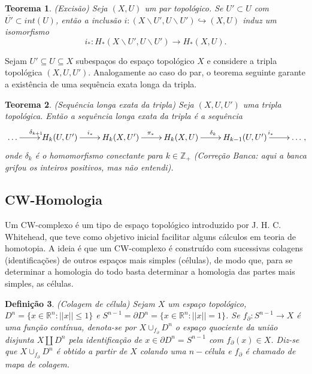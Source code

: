 \documentclass[12pt]{book}
\newtheorem{teorema}{Teorema}[section]
\newtheorem{definicao}[teorema]{Definição}
\newcommand{\complementar}[2]{#1 \backslash #2}
\newcommand{\homologiaabrev}[2]{H_{#1}(#2)}
\newcommand{\inteiros}{\mathbb{Z}}
\newcommand{\inteirospos}{\inteiros_{+}}
\newcommand{\alerta}[1]{{\color{red}#1}}
\newcommand{\correcaobanca}[1]{\alerta{(Correção Banca: #1)}}
\begin{document}
	\begin{teorema}
		(Excisão) Seja $(X, U)$ um par topológico. Se $U' \subset U$ com $\overline{U'} \subset int(U)$, então a inclusão $i : (\complementar{X}{U'}, \complementar{U}{U'}) \hookrightarrow (X, U)$ induz um isomorfismo 
		$$
		i_{*}: \homologiaabrev{*}{\complementar{X}{U'}, \complementar{U}{U'}} \to \homologiaabrev{*}{X, U}.
		$$
	\end{teorema}
	
	
	Sejam $U'\subseteq U \subseteq X$ subespaços do espaço topológico $X$ e considere a tripla topológica $(X, U, U')$. Analogamente ao caso do par, o teorema seguinte garante a existência de uma sequência exata longa da tripla.
	
	\begin{teorema}
		(Sequência longa exata da tripla) Seja $(X, U, U')$ uma tripla topológica. Então a sequência longa exata da tripla é a sequência
		$$
		\xymatrix{\dots \ar[r]^{\delta_{k+1}} & \homologiaabrev{k}{U, U'}\ar[r]^{i_{*}} & \homologiaabrev{k}{X, U'}\ar[r]^{\pi_{*}}& \homologiaabrev{k}{X, U}\ar[r]^{\delta_{k}} & \homologiaabrev{k-1}{U, U'} \ar[r]^{i_{*}}& \dots},
		$$
		onde $\delta_{k}$ é o homomorfismo conectante para $k \in \inteirospos$ \correcaobanca{aqui a banca grifou os inteiros positivos, mas não entendi}.
	\end{teorema}
	
	\subsection{CW-Homologia}\label{secao_cw_complexo}
	Um CW-complexo é um tipo de espaço topológico introduzido por J. H. C. Whitehead, que teve como objetivo inicial facilitar alguns cálculos em teoria de homotopia. A ideia é que um CW-complexo é construído com sucessivas colagens (identificações) de outros espaços mais simples (células), de modo que, para se determinar a homologia do todo basta determinar a homologia das partes mais simples, as células.
	\begin{definicao}
		(Colagem de célula) Sejam $X$ um espaço topológico, $D^{n}=\{x\in \mathbb{R}^{n} : ||x|| \leq 1\}$ e $S^{n-1} = \partial D^{n}=\{x\in \mathbb{R}^{n} : ||x|| = 1\}$. Se $f_{\partial}:S^{n-1} \to X$ é uma função contínua, denota-se por $X\cup_{f_{\partial}}D^{n}$ o espaço quociente da união disjunta $X \coprod D^{n}$ pela identificação de $x \in \partial D^{n} = S^{n-1}$ com $f_{\partial}(x) \in X$. Diz-se que $X\cup_{f_{\partial}}D^{n}$ é obtido a partir de $X$ colando uma $n-$célula e $f_{\partial}$ é chamado de mapa de colagem.
	\end{definicao}
	
\end{document}

